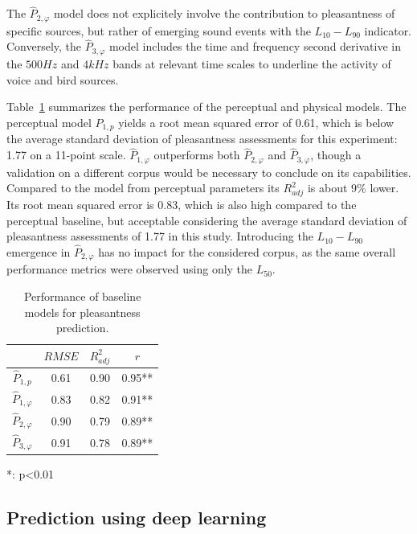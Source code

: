 \documentclass[twocolumn]{article}
\begin{document}
The $\hat P_{2, \varphi}$ model does not explicitely involve the contribution to pleasantness of specific sources, but rather of emerging sound events with the $L_{10}-L_{90}$ indicator. Conversely, the $\hat P_{3, \varphi}$ model includes the time and frequency second derivative in the $500Hz$ and $4kHz$ bands at relevant time scales to underline the activity of voice and bird sources.

Table~\ref{tab:pleasm} summarizes the performance of the perceptual and physical models. The perceptual model $\hat P_{1, p}$ yields a root mean squared error of 0.61, which is below the average standard deviation of pleasantness assessments for this experiment: 1.77 on a 11-point scale. $\hat P_{1, \varphi}$ outperforms both $\hat P_{2, \varphi}$ and $\hat P_{3, \varphi}$, though a validation on a different corpus would be necessary to conclude on its capabilities. Compared to the model from perceptual parameters its $R^2_{adj}$ is about 9\% lower. Its root mean squared error is 0.83, which is also high compared to the perceptual baseline, but acceptable considering the average standard deviation of pleasantness assessments of 1.77 in this study. Introducing the $L_{10}-L_{90}$ emergence in $\hat P_{2, \varphi}$ has no impact for the considered corpus, as the same overall performance metrics were observed using only the $L_{50}$.

\begin{table}[h]
\centering
\caption{Performance of baseline models for pleasantness prediction.}
\label{tab:pleasm}
\begin{threeparttable}
\begin{tabular}{ c | c | c | c }
\hline
	 & $RMSE$ & $R^2_{adj}$ & $r$ \\ \hline
	$\hat P_{1, p}$ & 0.61 & 0.90 & 0.95** \\ \hline
	$\hat P_{1, \varphi}$ & 0.83 & 0.82 & 0.91** \\
	$\hat P_{2, \varphi}$ & 0.90 & 0.79 & 0.89** \\
	$\hat P_{3, \varphi}$ & 0.91 & 0.78 & 0.89** \\ \hline
\end{tabular}
\begin{tablenotes}
\item **: p<0.01
\end{tablenotes}
\end{threeparttable}
\end{table}


\subsection{Prediction using deep learning}
\label{sec:app_deep}
\end{document}

